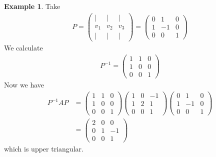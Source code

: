 \documentclass{article}
\theoremstyle{definition} \newtheorem*{definition}{Definition}
\newtheorem*{exmp}{Example} \newtheorem*{exmps}{Examples}
\begin{document}
\begin{exmp}
  Take 
  \begin{align*}
    P = \left( 
    \begin{matrix}
      | & | & |\\
      v_1 & v_2 & v_3 \\
      | & | & |
    \end{matrix}
    \right) = \left( 
    \begin{matrix}
      0 & 1 & 0\\
      1 & -1 & 0\\
      0 & 0 & 1
    \end{matrix}
    \right)
  \end{align*}
  We calculate 
  \begin{align*}
    P^{-1} = \left( 
    \begin{matrix}
      1 & 1 & 0\\
      1 & 0 & 0\\
      0 & 0 & 1
    \end{matrix}
    \right)
  \end{align*}
  Now we have
  \begin{align*}
    P^{-1}AP &= \left( 
    \begin{matrix}
      1 & 1 & 0\\
      1 & 0 & 0\\
      0 & 0 & 1
    \end{matrix}
    \right)\left( 
  \begin{matrix}
    1 & 0 & -1\\
    1 & 2 & 1\\
    0 & 0 & 1
  \end{matrix}
    \right)\left( 
    \begin{matrix}
      0 & 1 & 0\\
      1 & -1 & 0\\
      0 & 0 & 1
    \end{matrix}
    \right)\\&= \left( 
    \begin{matrix}
      2 & 0 & 0\\
      0 & 1 & -1\\
      0 & 0 & 1
    \end{matrix}
    \right)
  \end{align*}
  which is upper triangular.
\end{exmp}
\end{document}
